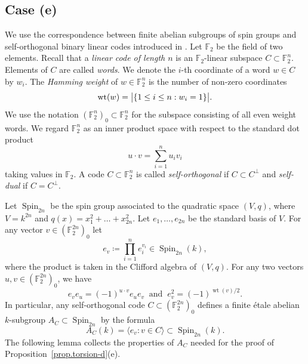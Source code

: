 \documentclass[12pt]{amsart}
\numberwithin{equation}{section}
\theoremstyle{remark}
\newcommand{\wt}{\operatorname{wt}}
\newcommand{\Spin}{\operatorname{Spin}}
\newcommand{\bF}{\mathbb{F}}
\begin{document}
\subsection{Case (e)} We use the correspondence between finite abelian subgroups of spin groups and self-orthogonal binary linear codes introduced in \cite{wood}. Let $\mathbb F_2$ be the field of two elements. Recall that a \emph{linear code of length $n$} is an $\mathbb F_2$-linear subspace $C \subset \bF_2^n$. Elements of $C$ are called \emph{words}. We denote the $i$-th coordinate of a word $w\in C$ by $w_i$. The \emph{Hamming weight} of $w\in \bF_2^n$ is the number of non-zero coordinates
$$\wt(w) = \big{|} \{ 1\leq i\leq n : w_i=1\} \big{|}.$$
We use the notation $(\bF_2^n)_0 \subset \bF_2^n$ for the subspace consisting of all even weight words.
 We regard  $\bF_2^n$ as an inner product space with respect to the standard dot product
$$u\cdot v = \sum_{i=1}^n u_i v_i$$
taking values in $\mathbb F_2$. A code $C\subset \bF_2^n$ is called \emph{self-orthogonal} if $C \subset C^{\perp}$ and \emph{self-dual} if $C = C^{\perp}$.

Let $\Spin_{2n}$ be the spin group associated to the quadratic space $(V,q)$, where $V = k^{2n}$ and  $q(x) = x_1 ^2+\dots +x_{2n}^2$. Let $e_1,\dots,e_{2n}$ be the standard basis of $V$. 
For any vector $v\in (\bF_2^{2n})_0$ let \[e_v\coloneqq \prod_{i=1}^ne_i^{v_i}\in \Spin_{2n}(k),\] where the product is taken in the Clifford algebra of $(V,q)$. For any two vectors $u,v\in (\bF_2^{2n})_0$, we have 
\begin{equation}\label{e.prop_of_e_u_e_v} 
e_v e_u = (-1)^{u \cdot v} e_u e_v \ \text{ and } \ e_v^2 = (-1)^{\wt(v)/2}.
\end{equation}
In particular, any self-orthogonal code $C \subset (\bF_2^{2n})_0$ defines a finite \'etale abelian $k$-subgroup $A_{C}\subset \Spin_{2n}$ by the formula
$$A_C(k) = \langle e_v : v\in C\rangle\subset \Spin_{2n}(k).$$
The following lemma collects the properties of $A_C$ needed for the proof of Proposition~\ref{prop.torsion-d}(e).
\end{document}
